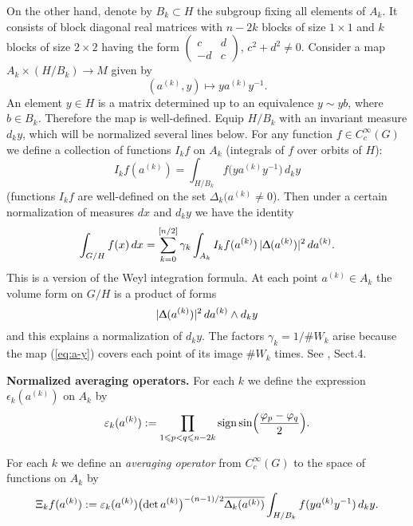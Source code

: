 \documentclass{article}
\newcounter{sec}
\def\sm{\smallskip}
\newcounter{punct}[sec]
\def\punct{\refstepcounter{punct}{\arabic{sec}.\arabic{punct}.  }}
\begin{document}
On the other hand, denote by $B_k\subset H$ the subgroup fixing all elements of 
$A_k$. It consists of block diagonal real matrices with $n-2k$ blocks of size $1\times 1$
and $k$ blocks of size $2\times 2$ having the form 
$\begin{pmatrix}
  c&d\\-d&c
 \end{pmatrix}$, $c^2+d^2\ne 0$.
 Consider a map
 $A_k\times (H/B_k)\to M$ given by 
 \begin{equation}
 (a^{(k)},y)\mapsto ya^{(k)}y^{-1}.
 \label{eq:a-y}
 \end{equation}
 An element $y\in H$ is a matrix  determined up to an equivalence 
 $y\sim yb$, where $b\in B_k$. Therefore the map is well-defined. 
 Equip $H/B_k$ with an invariant measure $d_ky$, which will be normalized several lines below.
 For any function $f\in C^\infty_c(G)$ we define a collection of functions $ I_kf$ on $A_k$
 (integrals of $f$ over orbits of $H$):
 $$
 I_kf(a^{(k)})=\int_{H/B_k} f\bigl(y a^{(k)}y^{-1}\bigr)\,d_ky
 $$
 (functions $ I_kf$ are well-defined on the set $\Delta_k(a^{(k)}\ne 0$).
 Then under a certain normalization of measures $dx$ and $d_k y$
 we have the identity
\begin{equation}
\int_{G/H} f(x)\, dx=
\sum_{k=0}^{[n/2]} \gamma_k \int_{A_k} I_k f(a^{(k)})\, |\Updelta(a^{(k)})|^2\,d a^{(k)}.
\label{eq:weyl-inegration}
\end{equation}
This is a version of the Weyl integration formula. At each point $a^{(k)}\in A_k$ the volume form
on $G/H$
is a product of forms
$$
|\Updelta(a^{(k)})|^2\,da^{(k)} \wedge d_k y
$$
and this explains a normalization of $d_k y$. The factors $\gamma_k=1/{\# W_k}$
arise because the map (\ref{eq:a-y}) covers each point of its image $\# W_k$ times.
See \cite{San}, Sect.4.

\sm

{\bf \punct Normalized averaging operators.}
For each $k$ we define the expression $\epsilon_k(a^{(k)})$ on $A_k$ by
$$
\varepsilon_k(a^{(k)}):=\prod_{1\leqslant p<q\leqslant {n-2k}} \mathop {\mathrm {sign}}\nolimits\sin\Bigl(\frac{\varphi_p-\varphi_q}2\Bigr).
$$


For each $k$ we define an {\it averaging operator}
from $C_c^\infty(G)$ to the space of functions on $A_k$ by
\begin{equation}
\Xi_k f(a^{(k)}):= \varepsilon_k(a^{(k)})\bigl(\det a^{(k)}\bigr)^{-(n-1)/2} \overline{\Updelta_k(a^{(k)})}
 \int_{H/B_k} f(y a^{(k)}y^{-1})\,d_ky.
\label{eq:average-operator}
\end{equation}

\end{document}
